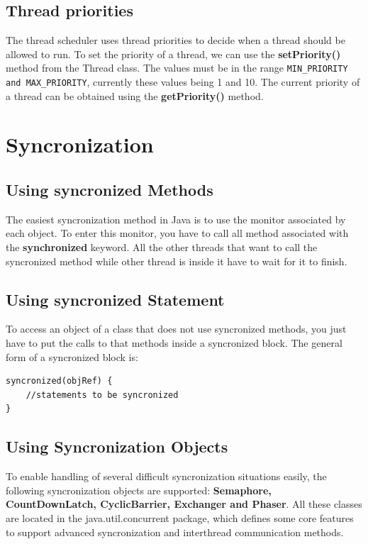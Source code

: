 \subsection{Thread priorities}

The thread scheduler uses thread priorities to decide when a thread should be allowed to run. To set the priority of a thread, we can use the \textbf{setPriority()} method from the Thread class. The values must be in the range \verb|MIN_PRIORITY and MAX_PRIORITY|, currently these values being 1 and 10. The current priority of a thread can be obtained using the \textbf{getPriority()} method.

\section{Syncronization}

\subsection{Using syncronized Methods}

The easiest syncronization method in Java is to use the monitor associated by each object. To enter this monitor, you have to call all method associated with the \textbf{synchronized} keyword. All the other threads that want to call the syncronized method while other thread is inside it have to wait for it to finish.

\subsection{Using syncronized Statement}

To access an object of a class that does not use syncronized methods, you just have to put the calls to that methods inside a syncronized block. The general form of a syncronized block is:
\begin{lstlisting}
syncronized(objRef) {
	//statements to be syncronized
}
\end{lstlisting}

\subsection{Using Syncronization Objects}

To enable handling of several difficult syncronization situations easily, the following syncronization objects are supported: \textbf{Semaphore, CountDownLatch, CyclicBarrier, Exchanger and Phaser}. All these classes are located in the java.util.concurrent package, which defines some core features to support advanced syncronization and interthread communication methods.

